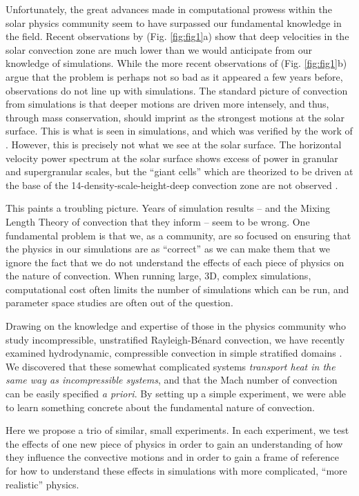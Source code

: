 \documentclass[aasms,12pt]{article}
\newcommand{\RB}{Rayleigh-B\'{e}nard }
\begin{document}
Unfortunately, the great advances made in computational prowess within the solar physics
community seem to have surpassed our fundamental knowledge in the field. Recent observations
by \citealt{hanasoge&all2012} (Fig. \ref{fig:fig1}a) show that deep velocities in the solar convection zone
are much lower than we would anticipate from our knowledge of simulations.  While the
more recent observations of \citealt{greer&all2015} (Fig. \ref{fig:fig1}b) 
argue that the problem is perhaps not so bad
as it appeared a few years before, observations do not line up with simulations.  The standard
picture of convection from simulations is that deeper motions are driven more intensely, and
thus, through mass conservation, should imprint as the strongest motions at the solar surface.
This is what is seen in simulations, and which was verified by the work of \citealt{lord&all2014}.  However,
this is precisely not what we see at the solar surface.  The horizontal velocity power spectrum
at the solar surface shows excess of power in granular and supergranular scales, but the
``giant cells'' which are theorized to be driven at the base of the 14-density-scale-height-deep
convection zone are not observed \citep{hathaway&all2015}.

This paints a troubling picture.  Years of simulation results -- and the Mixing Length
Theory of convection that they inform -- seem to be wrong.  One fundamental problem is that
we, as a community, are so focused on ensuring that the physics in our simulations are 
as ``correct'' as we can make them that we ignore the fact that we do not understand the
effects of each piece of physics on the nature of convection.  When running large, 3D,
complex simulations, computational cost often limits the number of simulations which can be
run, and parameter space studies are often out of the question.  

Drawing on the knowledge and expertise of those in the physics community who study incompressible,
unstratified \RB convection, we have recently examined hydrodynamic, compressible convection
in simple stratified domains \citealt{anders&brown2017}.  We discovered that these somewhat complicated systems
\emph{transport heat in the same way as incompressible systems}, and that the Mach number of
convection can be easily specified \emph{a priori}.  By setting up a simple experiment, we
were able to learn something concrete about the fundamental nature of convection.  

Here we propose a trio of similar, small experiments.  In each experiment, we test the effects
of one new piece of physics in order to gain an understanding of how they influence the convective
motions and in order to gain a frame of reference for how to understand these effects in 
simulations with more complicated, ``more realistic'' physics.
\end{document}
